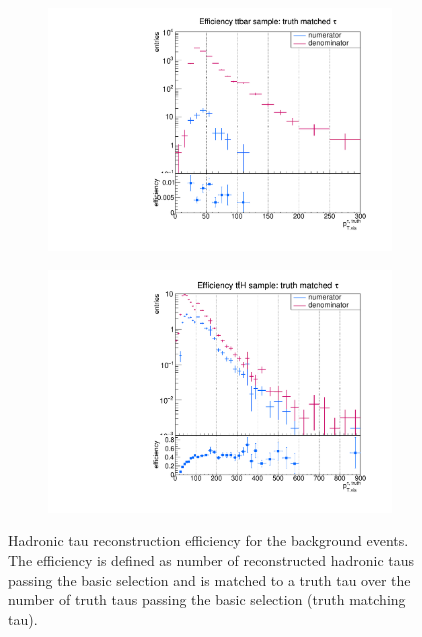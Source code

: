 %
\begin{figure}
  \centering
                \begin{subfigure}[t]{0.49\textwidth}
                \includegraphics[width=\textwidth]{figures/plots/ttbar/Divided_Tau.pdf}
                \label{DividedTau:bg:ttbar}
                \end{subfigure}
                \begin{subfigure}[t]{0.49\textwidth}
                \includegraphics[width=\textwidth]{figures/plots/ttH/Divided_Tau.pdf}
                \label{DividedTau:bg:ttH}
                \end{subfigure}
\caption[Hadronic tau reconstruction efficiency for the background events.]{Hadronic tau reconstruction efficiency for the background events. The efficiency is defined as number of reconstructed hadronic taus passing the basic selection and is matched to a truth tau over the number of truth taus passing the basic selection (truth matching tau).}
\label{DividedTau:bg}
\end{figure}
